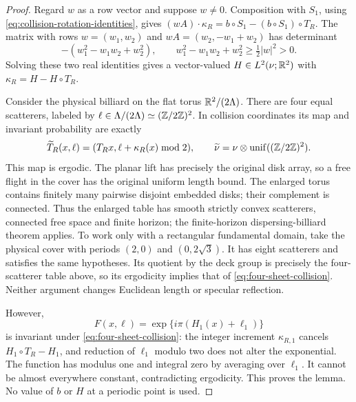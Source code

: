 \begin{proof}
Regard $w$ as a row vector and suppose $w\ne0$.
Composition with $S_1$, using \eqref{eq:collision-rotation-identities},
gives $(wA)\cdot\kappa_R=b\circ S_1-(b\circ S_1)\circ T_R$.
The matrix with rows $w=(w_1,w_2)$ and
$wA=(w_2,-w_1+w_2)$ has determinant
\begin{equation}\label{eq:spatial-rotation-determinant}
 -(w_1^2-w_1w_2+w_2^2),
 \qquad w_1^2-w_1w_2+w_2^2\ge\tfrac12|w|^2>0.
\end{equation}
Solving these two real identities gives a vector-valued
$H\in L^2(\nu;\mathbb R^2)$ with $\kappa_R=H-H\circ T_R$.

Consider the physical billiard on the flat torus $\mathbb R^2/(2\Lambda)$.
There are four equal scatterers, labeled by
$\ell\in\Lambda/(2\Lambda)\simeq(\mathbb Z/2\mathbb Z)^2$. In collision
coordinates its map and invariant probability are exactly
\begin{equation}\label{eq:four-sheet-collision}
 \widetilde T_R(x,\ell)
       =(T_Rx,\ell+\kappa_R(x)\bmod2),\qquad
 \widetilde\nu=\nu\otimes\operatorname{unif}((\Z/2\Z)^2).
\end{equation}
This map is ergodic. The planar lift has precisely the original disk
array, so a free flight in the cover has the original uniform length
bound. The enlarged torus contains finitely many pairwise disjoint
embedded disks; their complement is connected. Thus the enlarged table
has smooth strictly convex scatterers, connected free space and finite
horizon; the finite-horizon dispersing-billiard theorem
\cite[Section 8.1, Theorem 6]{Young} applies. To work only with a
rectangular fundamental domain, take the physical cover with periods
$(2,0)$ and $(0,2\sqrt3)$. It has eight scatterers and satisfies the
same hypotheses. Its quotient by the deck group is precisely the
four-scatterer table above, so its ergodicity implies that of
\eqref{eq:four-sheet-collision}. Neither argument changes Euclidean
length or specular reflection.

However,
\[
 F(x,\ell)=\exp\{i\pi(H_1(x)+\ell_1)\}
\]
is invariant under \eqref{eq:four-sheet-collision}: the integer
increment $\kappa_{R,1}$ cancels $H_1\circ T_R-H_1$, and reduction
of $\ell_1$ modulo two does not alter the exponential. The function
has modulus one and integral zero by averaging over $\ell_1$.
It cannot be almost everywhere constant, contradicting ergodicity.
This proves the lemma. No value of $b$ or $H$ at a periodic point is
used.
\end{proof}

